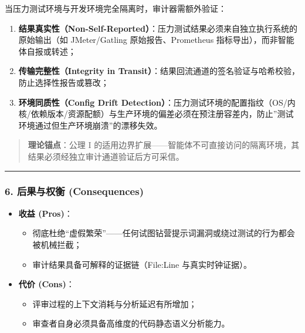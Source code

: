 当压力测试环境与开发环境完全隔离时，审计器需额外验证：

\begin{enumerate}
\def\labelenumi{\arabic{enumi}.}
\tightlist
\item
  \textbf{结果真实性（Non-Self-Reported）}：压力测试结果必须来自独立执行系统的原始输出（如
  JMeter/Gatling 原始报告、Prometheus 指标导出），而非智能体自报或转述；
\item
  \textbf{传输完整性（Integrity in
  Transit）}：结果回流通道的签名验证与哈希校验，防止选择性报告或篡改；
\item
  \textbf{环境同质性（Config Drift
  Detection）}：压力测试环境的配置指纹（OS/内核/依赖版本/资源配额）与生产环境的偏差必须在预注册容差内，防止''测试环境通过但生产环境崩溃''的漂移失效。
\end{enumerate}

\begin{quote}
\textbf{理论锚点}：公理 I
的适用边界扩展------智能体不可直接访问的隔离环境，其结果必须经独立审计通道验证后方可采信。
\end{quote}

\begin{center}\rule{0.5\linewidth}{0.5pt}\end{center}

\subsubsection{6. 后果与权衡
(Consequences)}\label{ux540eux679cux4e0eux6743ux8861-consequences-1}

\begin{itemize}
\tightlist
\item
  \textbf{收益 (Pros)}：

  \begin{itemize}
  \tightlist
  \item
    彻底杜绝``虚假繁荣''------任何试图钻营提示词漏洞或绕过测试的行为都会被机械拦截；
  \item
    审计结果具备可解释的证据链（File:Line 与真实时钟证据）。
  \end{itemize}
\item
  \textbf{代价 (Cons)}：

  \begin{itemize}
  \tightlist
  \item
    评审过程的上下文消耗与分析延迟有所增加；
  \item
    审查者自身必须具备高维度的代码静态语义分析能力。
  \end{itemize}
\end{itemize}

